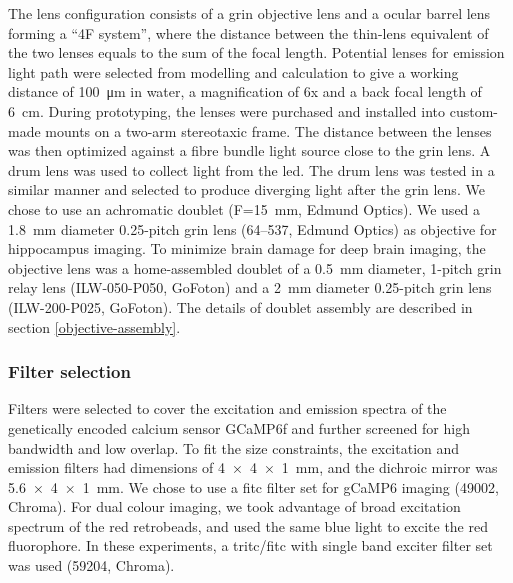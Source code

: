 The lens configuration consists of a \gls{grin} objective lens and a ocular barrel lens forming a ``4F system'', where the distance between the thin-lens equivalent of the two lenses equals to the sum of the focal length. Potential lenses for emission light path were selected from modelling and calculation to give a working distance of \SI{100}{\um} in water, a magnification of 6x and a back focal length of \SI{6}{\cm}. During prototyping, the lenses were purchased and installed into custom-made mounts on a two-arm stereotaxic frame. The distance between the lenses was then optimized against a fibre bundle light source close to the \gls{grin} lens. A drum lens was used to collect light from the \gls{led}. The drum lens was tested in a similar manner and selected to produce diverging light after the \gls{grin} lens. We chose to use an achromatic doublet (F=\SI{15}{\mm}, Edmund Optics). We used a \SI{1.8}{\mm} diameter 0.25-pitch \gls{grin} lens (64--537, Edmund Optics) as objective for hippocampus imaging. To minimize brain damage for deep brain imaging, the objective lens was a home-assembled doublet of a \SI{0.5}{\mm} diameter, 1-pitch \gls{grin} relay lens (ILW-050-P050, GoFoton) and a \SI{2}{\mm} diameter 0.25-pitch \gls{grin} lens (ILW-200-P025, GoFoton). The details of doublet assembly are described in section \ref{objective-assembly}.

\subsubsection{Filter selection}
Filters were selected to cover the excitation and emission spectra of the genetically encoded calcium sensor GCaMP6f \citep{chen13} and further screened for high bandwidth and low overlap. To fit the size constraints, the excitation and emission filters had dimensions of \SI{4x4x1}{\mm}, and the dichroic mirror was \SI{5.6x4x1}{\mm}. We chose to use a \gls{fitc} filter set for gCaMP6 imaging (49002, Chroma). For dual colour imaging, we took advantage of broad excitation spectrum of the red retrobeads, and used the same blue light to excite the red fluorophore. In these experiments, a \acrshort{tritc}\slash\acrshort{fitc} with single band exciter filter set was used (59204, Chroma).

